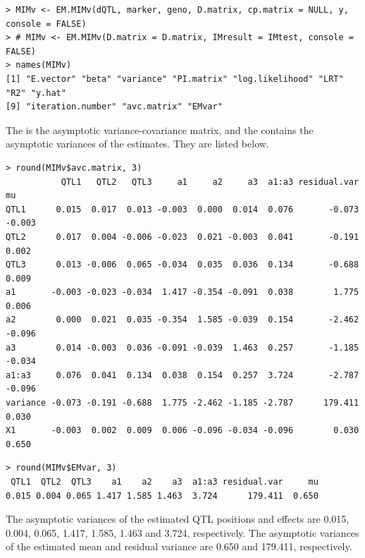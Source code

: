 \begin{verbatim}
> MIMv <- EM.MIMv(dQTL, marker, geno, D.matrix, cp.matrix = NULL, y, console = FALSE) 
> # MIMv <- EM.MIMv(D.matrix = D.matrix, IMresult = IMtest, console = FALSE)
> names(MIMv)
[1] "E.vector" "beta" "variance" "PI.matrix" "log.likelihood" "LRT" "R2" "y.hat"
[9] "iteration.number" "avc.matrix" "EMvar"
\end{verbatim}

\noindent The  is the asymptotic variance-covariance matrix, and the  contains the asymptotic variances of the estimates. They are listed below.

\begin{verbatim}
> round(MIMv$avc.matrix, 3)
           QTL1   QTL2   QTL3     a1     a2     a3  a1:a3 residual.var     mu
QTL1      0.015  0.017  0.013 -0.003  0.000  0.014  0.076       -0.073 -0.003
QTL2      0.017  0.004 -0.006 -0.023  0.021 -0.003  0.041       -0.191  0.002
QTL3      0.013 -0.006  0.065 -0.034  0.035  0.036  0.134       -0.688  0.009
a1       -0.003 -0.023 -0.034  1.417 -0.354 -0.091  0.038        1.775  0.006
a2        0.000  0.021  0.035 -0.354  1.585 -0.039  0.154       -2.462 -0.096
a3        0.014 -0.003  0.036 -0.091 -0.039  1.463  0.257       -1.185 -0.034
a1:a3     0.076  0.041  0.134  0.038  0.154  0.257  3.724       -2.787 -0.096
variance -0.073 -0.191 -0.688  1.775 -2.462 -1.185 -2.787      179.411  0.030
X1       -0.003  0.002  0.009  0.006 -0.096 -0.034 -0.096        0.030  0.650
\end{verbatim}

\begin{verbatim}
> round(MIMv$EMvar, 3)
 QTL1  QTL2  QTL3    a1    a2    a3  a1:a3 residual.var     mu
0.015 0.004 0.065 1.417 1.585 1.463  3.724      179.411  0.650
\end{verbatim}

\noindent The asymptotic variances of the estimated QTL positions and effects are 0.015, 0.004, 0.065, 1.417, 1.585, 1.463 and 3.724, respectively. The asymptotic variances of the estimated mean and residual variance are 0.650 and 179.411, respectively.

